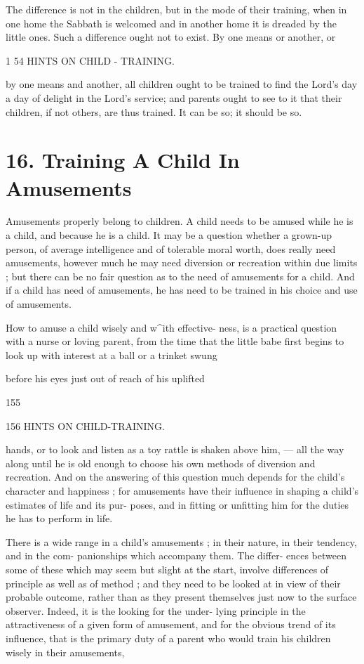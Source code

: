 \documentclass[
]{book}
\begin{document}
The difference is not in the children, but in the mode of their training, when in one home the Sabbath is welcomed and in another home it is dreaded by the little ones. Such a difference ought not to exist. By one means or another, or

1 54 HINTS ON CHILD - TRAINING.

by one means and another, all children ought to be trained to find the Lord's day a day of delight in the Lord's service; and parents ought to see to it that their children, if not others, are thus trained. It can be so; it should be so.

\hypertarget{training-a-child-in-amusements}{%
\chapter{16. Training A Child In Amusements}\label{training-a-child-in-amusements}}

Amusements properly belong to children. A child needs to be amused while he is a child, and because he is a child. It may be a question whether a grown-up person, of average intelligence and of tolerable moral worth, does really need amusements, however much he may need diversion or recreation within due limits ; but there can be no fair question as to the need of amusements for a child. And if a child has need of amusements, he has need to be trained in his choice and use of amusements.

How to amuse a child wisely and w\^{}ith effective- ness, is a practical question with a nurse or loving parent, from the time that the little babe first begins to look up with interest at a ball or a trinket swung

before his eyes just out of reach of his uplifted

155

156 HINTS ON CHILD-TRAINING.

hands, or to look and listen as a toy rattle is shaken above him, --- all the way along until he is old enough to choose his own methods of diversion and recreation. And on the answering of this question much depends for the child's character and happiness ; for amusements have their influence in shaping a child's estimates of life and its pur- poses, and in fitting or unfitting him for the duties he has to perform in life.

There is a wide range in a child's amusements ; in their nature, in their tendency, and in the com- panionships which accompany them. The differ- ences between some of these which may seem but slight at the start, involve differences of principle as well as of method ; and they need to be looked at in view of their probable outcome, rather than as they present themselves just now to the surface observer. Indeed, it is the looking for the under- lying principle in the attractiveness of a given form of amusement, and for the obvious trend of its influence, that is the primary duty of a parent who would train his children wisely in their amusements,
\end{document}
